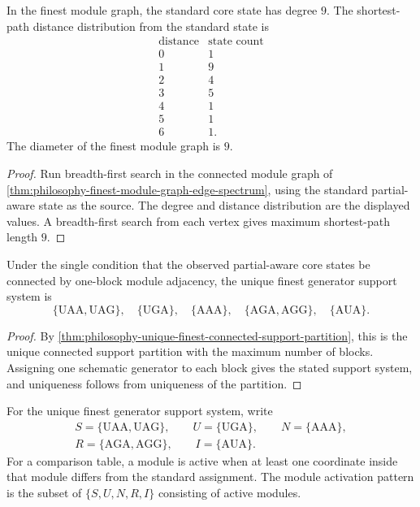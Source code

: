 \begin{theorem}
\label{thm:philosophy-standard-state-module-graph-distances}
In the finest module graph, the standard core state has degree $9$.
The shortest-path distance distribution from the standard state is
$$
\begin{array}{c|c}
  \text{distance} & \text{state count}\\
\hline
  0 & 1\\
  1 & 9\\
  2 & 4\\
  3 & 5\\
  4 & 1\\
  5 & 1\\
  6 & 1.
\end{array}
$$
The diameter of the finest module graph is $9$.
\end{theorem}
\begin{proof}
Run breadth-first search in the connected module graph of
\autoref{thm:philosophy-finest-module-graph-edge-spectrum}, using the
standard partial-aware state as the source. The degree and distance
distribution are the displayed values. A breadth-first search from each
vertex gives maximum shortest-path length $9$.
\end{proof}

\begin{theorem}
\label{thm:philosophy-unique-finest-generator-system}
Under the single condition that the observed partial-aware core states
be connected by one-block module adjacency, the unique finest generator
support system is
$$
  \{\mathrm{UAA},\mathrm{UAG}\},\quad
  \{\mathrm{UGA}\},\quad
  \{\mathrm{AAA}\},\quad
  \{\mathrm{AGA},\mathrm{AGG}\},\quad
  \{\mathrm{AUA}\}.
$$
\end{theorem}
\begin{proof}
By
\autoref{thm:philosophy-unique-finest-connected-support-partition}, this
is the unique connected support partition with the maximum number of
blocks. Assigning one schematic generator to each block gives the stated
support system, and uniqueness follows from uniqueness of the partition.
\end{proof}

\begin{definition}
\label{def:philosophy-module-activation-pattern}
For the unique finest generator support system, write
$$
\begin{gathered}
  S=\{\mathrm{UAA},\mathrm{UAG}\},\qquad
  U=\{\mathrm{UGA}\},\qquad
  N=\{\mathrm{AAA}\},\\
  R=\{\mathrm{AGA},\mathrm{AGG}\},\qquad
  I=\{\mathrm{AUA}\}.
\end{gathered}
$$
For a comparison table, a module is active when at least one coordinate
inside that module differs from the standard assignment. The module
activation pattern is the subset of $\{S,U,N,R,I\}$ consisting of active
modules.
\end{definition}

